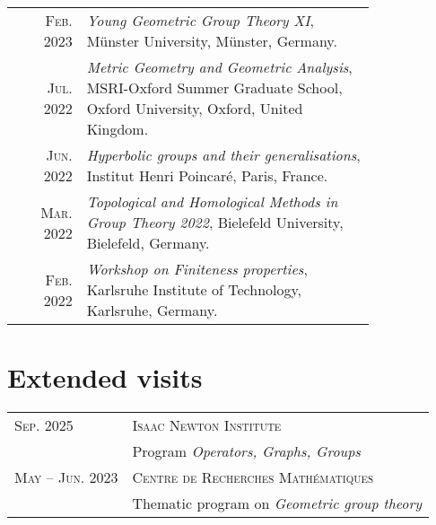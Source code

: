 \documentclass[a4paper,11pt]{article} %
\begin{document}
\begin{longtable}{rp{0.8\linewidth}}
    \textsc{Feb. 2023} & \emph{Young Geometric Group Theory XI}, Münster University, Münster, Germany. \\ %

    \textsc{Jul. 2022} & \emph{Metric Geometry and Geometric Analysis}, MSRI-Oxford Summer Graduate
    School, Oxford University, Oxford, United Kingdom. \\ %

    \textsc{Jun. 2022} & \emph{Hyperbolic groups and their generalisations}, Institut Henri Poincaré, Paris,
    France. \\ %

    \textsc{Mar. 2022} & \emph{Topological and Homological Methods in Group Theory 2022}, Bielefeld University, Bielefeld, Germany. \\ %
    
    \textsc{Feb. 2022} & \emph{Workshop on Finiteness properties}, Karlsruhe Institute of Technology, Karlsruhe, Germany. \\ %

\end{longtable}



\section{Extended visits}

\begin{longtable}{>{\raggedleft\arraybackslash}p{4cm}p{10cm}}


\textsc{Sep. 2025} &\textsc{Isaac Newton Institute} \\ &Program \emph{Operators, Graphs, Groups} \vspace{0.5em}\\

\textsc{May -- Jun. 2023} &\textsc{Centre de Recherches Mathématiques} \\ & Thematic program on \emph{Geometric group theory}

\end{longtable}
\end{document}
